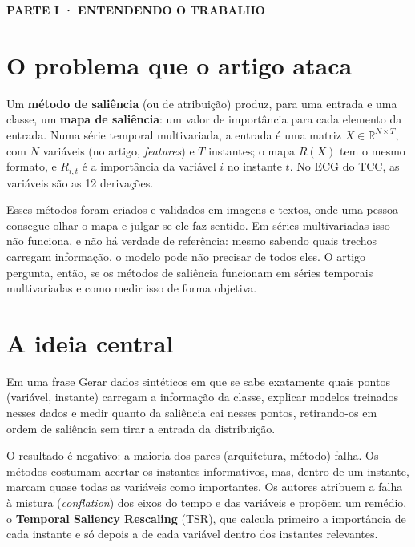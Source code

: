 \documentclass[11pt,a4paper]{article}
\newcommand{\partbar}[1]{\par\vspace{1.2em}\noindent\colorbox{black!80}{\parbox{\dimexpr\linewidth-2\fboxsep}{\color{white}\bfseries\sffamily\MakeUppercase{#1}}}\par\vspace{0.4em}}
\begin{document}
\partbar{Parte I · Entendendo o trabalho}

\section{O problema que o artigo ataca}
Um \textbf{método de saliência} (ou de atribuição) produz, para uma entrada e uma classe, um \textbf{mapa de saliência}: um valor de importância para cada elemento da entrada. Numa série temporal multivariada, a entrada é uma matriz $X \in \mathbb{R}^{N \times T}$, com $N$ variáveis (no artigo, \textit{features}) e $T$ instantes; o mapa $R(X)$ tem o mesmo formato, e $R_{i,t}$ é a importância da variável $i$ no instante $t$. No ECG do TCC, as variáveis são as 12 derivações.

Esses métodos foram criados e validados em imagens e textos, onde uma pessoa consegue olhar o mapa e julgar se ele faz sentido. Em séries multivariadas isso não funciona, e não há verdade de referência: mesmo sabendo quais trechos carregam informação, o modelo pode não precisar de todos eles. O artigo pergunta, então, se os métodos de saliência funcionam em séries temporais multivariadas e como medir isso de forma objetiva.

\section{A ideia central}
\begin{infobox}[note]{Em uma frase}
Gerar dados sintéticos em que se sabe exatamente quais pontos (variável, instante) carregam a informação da classe, explicar modelos treinados nesses dados e medir quanto da saliência cai nesses pontos, retirando-os em ordem de saliência sem tirar a entrada da distribuição.
\end{infobox}
O resultado é negativo: a maioria dos pares (arquitetura, método) falha. Os métodos costumam acertar os instantes informativos, mas, dentro de um instante, marcam quase todas as variáveis como importantes. Os autores atribuem a falha à mistura (\textit{conflation}) dos eixos do tempo e das variáveis e propõem um remédio, o \textbf{Temporal Saliency Rescaling} (TSR), que calcula primeiro a importância de cada instante e só depois a de cada variável dentro dos instantes relevantes.
\end{document}
